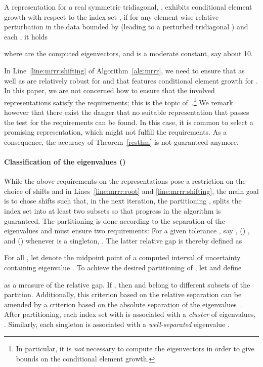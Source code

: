 \documentclass[final]{siamltex}
\begin{document}
\begin{definition} 
A representation for a real symmetric tridiagonal, , exhibits conditional
element growth with respect to the index set ,
if for any element-wise relative perturbation in the data
bounded by  (leading to a perturbed tridiagonal ) and each , it holds

where  are the computed eigenvectors, and  is a moderate
constant, say about 10. 
\end{definition}

In Line~\ref{line:mrrr:shifting} of Algorithm~\ref{alg:mrrr}, we need to
ensure that  as well as  are relatively robust for
 and that  features conditional element growth
for . 
In this paper, we are not concerned how to ensure that the involved representations satisfy
the requirements; this is the topic
of~\cite{perturbLDL,Parlett2000121,Dhillon:2004:Ortvecs,Willems:framework}.\footnote{In
  particular, it is {\it not} necessary to compute the eigenvectors in order
  to give bounds on the conditional element growth.} 
We 
remark however that there exist the danger that no suitable representation
that passes the test for the requirements can be found. In this case,
it is common to select a promising representation, which might not fulfill the
requirements. As a consequence, the accuracy of Theorem~\ref{resthm} is not
guaranteed anymore.    

\paragraph{Classification of the eigenvalues ()} 

While the above requirements on the representations pose a restriction on the
choice of shifts  and  in
Lines~\ref{line:mrrr:root} and \ref{line:mrrr:shifting}, the main goal is to
chose shifts such that, in the next iteration, the partitioning , splits the index set into at least two subsets so that progress
in the algorithm is guaranteed. 
The partitioning is done according to the 
separation of the eigenvalues and must ensure two requirements: For a given
tolerance , say , ()  , and ()
whenever  is a singleton, . The latter relative gap is thereby defined as 
 

For all , let  denote the midpoint point
of a computed interval of uncertainty
 containing eigenvalue
. To achieve the desired partitioning of , let  and define 

as a measure of the relative gap. If , then  and
 belong to different subsets of the partition. Additionally, this criterion
based on the relative separation can be amended by a criterion based on the
absolute separation of the eigenvalues~\cite{VoemelRefinedTree2007tr}. After
partitioning, each index set 
 with  is associated with a {\it cluster}
of eigenvalues, . Similarly, each
singleton  is associated with a {\it
  well-separated} eigenvalue .
\end{document}
